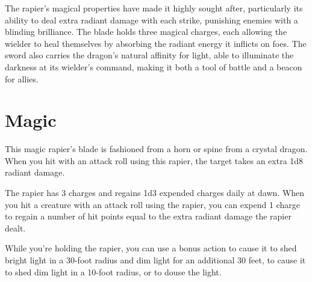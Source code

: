The rapier's magical properties have made it highly sought after, particularly its ability to deal extra radiant damage with each strike, punishing enemies with a blinding brilliance. The blade holds three magical charges, each allowing the wielder to heal themselves by absorbing the radiant energy it inflicts on foes. The sword also carries the dragon's natural affinity for light, able to illuminate the darkness at its wielder's command, making it both a tool of battle and a beacon for allies.

\section*{Magic}
This magic rapier's blade is fashioned from a horn or spine from a crystal dragon. When you hit with an attack roll using this rapier, the target takes an extra 1d8 radiant damage.

The rapier has 3 charges and regains 1d3 expended charges daily at dawn. When you hit a creature with an attack roll using the rapier, you can expend 1 charge to regain a number of hit points equal to the extra radiant damage the rapier dealt.

While you're holding the rapier, you can use a bonus action to cause it to shed bright light in a 30-foot radius and dim light for an additional 30 feet, to cause it to shed dim light in a 10-foot radius, or to douse the light.